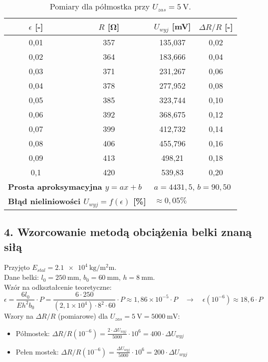 \documentclass[12pt, a4paper]{article}
\begin{document}
	\begin{table}[H]
		\centering
		\caption{Pomiary dla półmostka przy $U_{zas} = \SI{5}{\volt}$.}
		\begin{tabular}{cccc}
			\toprule
			$\epsilon$ [-] & $R$ [\si{\ohm}] & $U_{wyj}$ [\si{\milli\volt}] & $\Delta R/R$ [-] \\
			\midrule
			0,01 & 357 & 135,037 & 0,02 \\
			0,02 & 364 & 183,666 & 0,04 \\
			0,03 & 371 & 231,267 & 0,06 \\
			0,04 & 378 & 277,952 & 0,08 \\
			0,05 & 385 & 323,744 & 0,10 \\
			0,06 & 392 & 368,675 & 0,12 \\
			0,07 & 399 & 412,732 & 0,14 \\
			0,08 & 406 & 455,796 & 0,16 \\
			0,09 & 413 & 498,21 & 0,18 \\
			0,1 & 420 & 539,83 & 0,20 \\
			\midrule
			\multicolumn{2}{l}{\textbf{Prosta aproksymacyjna $y = ax + b$}} & \multicolumn{2}{l}{$a = 4431,5$, $b = 90,50$} \\
			\multicolumn{2}{l}{\textbf{Błąd nieliniowości $U_{wyj} = f(\epsilon)$ [\%]}} & \multicolumn{2}{l}{$\approx 0,05 \%$} \\
			\bottomrule
		\end{tabular}
	\end{table}
	
	\newpage
	\subsection{4. Wzorcowanie metodą obciążenia belki znaną siłą}
	Przyjęto $E_{stal} = \SI{2.1e4}{\kilo\gram\per\square\milli\meter}$. \\
	Dane belki: $l_0 = \SI{250}{\milli\meter}$, $b_0 = \SI{60}{\milli\meter}$, $h = \SI{8}{\milli\meter}$. \\
	Wzór na odkształcenie teoretyczne:
	$$ \epsilon = \frac{6 l_0}{E h^2 b_0} \cdot P = \frac{6 \cdot 250}{ (2,1 \times 10^4) \cdot 8^2 \cdot 60} \cdot P \approx 1,86 \times 10^{-5} \cdot P \quad \rightarrow \quad \epsilon (10^{-6}) \approx 18,6 \cdot P $$
	Wzory na $\Delta R/R$ (pomiarowe) dla $U_{zas} = \SI{5}{\volt} = \SI{5000}{\milli\volt}$:
	\begin{itemize}
		\item Półmostek: $\Delta R/R (10^{-6}) = \frac{2 \cdot \Delta U_{wyj}}{5000} \cdot 10^6 = 400 \cdot \Delta U_{wyj}$
		\item Pełen mostek: $\Delta R/R (10^{-6}) = \frac{\Delta U_{wyj}}{5000} \cdot 10^6 = 200 \cdot \Delta U_{wyj}$
	\end{itemize}
	
\end{document}
